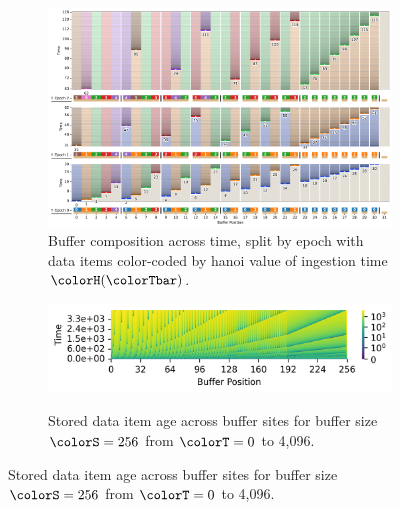 \begin{figure}[htbp!]
\begin{subfigure}[b]{\linewidth}
\includegraphics[width=\linewidth]{
binder/teeplots/11/num-generations=128+reservation-mode=steady+surface-size=32+viz=site-reservation-by-rank-spliced-at-heatmap+ext=}
\vspace{-4.5ex}\caption{
  Buffer composition across time, split by epoch with data items color-coded by hanoi value of ingestion time $\colorH(\colorTbar)$.
}
\label{fig:hsurf-steady-implementation-schematic}
\end{subfigure}

\vspace{0.5ex}
\begin{minipage}[]{\textwidth}
 \vspace{-2pt}
  \begin{subfigure}[t]{0.65\linewidth}
    \vspace{0pt}
    \centering
  \includegraphics[width=0.88\linewidth,clip]{binder/teeplots/11/cnorm=log+num-generations=4096+surface-size=256+viz=site-ingest-depth-by-rank-heatmap+ynorm=linear+ext=.png}  %
  \end{subfigure}%
  \begin{subfigure}[t]{0.35\linewidth}
  \vspace{-2pt}
  \caption{%
    \footnotesize
    Stored data item age across buffer sites for buffer size $\colorS=256$ from $\colorT=0$ to 4,096.
  }
  \label{fig:hsurf-steady-implementation-heatmap}
\end{subfigure}
\end{minipage}


\end{figure}
